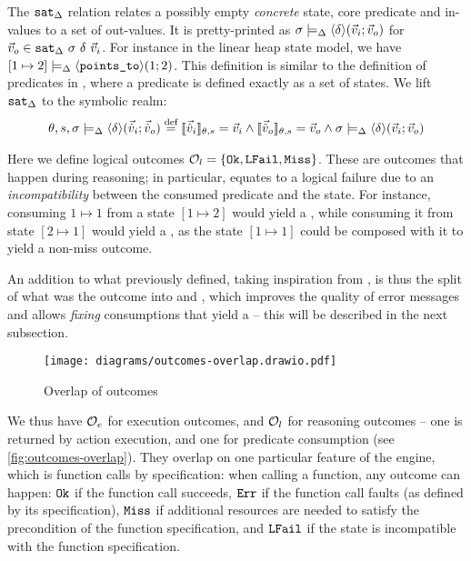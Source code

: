 The $\texttt{sat}_{\Delta}$ relation relates a possibly empty \emph{concrete} state, core predicate and in-values to a set of out-values. It is pretty-printed as $\sigma \models_{\Delta} \left<\delta\right>\!(\vec{v}_i;\vec{v}_o)$ for $\vec{v}_o \in \texttt{sat}_{\Delta}~\sigma~\delta~\vec{v}_i$. For instance in the linear heap state model, we have $[ 1 \mapsto 2 ] \models_{\Delta} \left<\texttt{points\_to}\right>\!(1;2)$. This definition is similar to the definition of predicates in \cite{abstractseplogic,localreasoning}, where a predicate is defined exactly as a set of states. We lift $\texttt{sat}_{\Delta}$ to the symbolic realm: 
\begin{align*}
	\theta,s,\sigma\models_{\Delta} \left<\delta\right>\!(\vec{\hat{v}}_i;\vec{\hat{v}}_o) \stackrel{\textnormal{def}}= \llbracket\vec{\hat{v}}_i\rrbracket_{\theta,s}=\vec{v}_i \land \llbracket\vec{\hat{v}}_o\rrbracket_{\theta,s}=\vec{v}_o \land \sigma\models_{\Delta} \left<\delta\right>\!(\vec{v}_i;\vec{v}_o)
\end{align*}

Here we define logical outcomes ${\cal O}_l = \{\texttt{Ok}, \texttt{LFail}, \texttt{Miss} \}$. These are outcomes that happen during reasoning; in particular, \LFail{} equates to a logical failure due to an \emph{incompatibility} between the consumed predicate and the state. For instance, consuming $1 \mapsto 1$ from a state $[1 \mapsto 2]$ would yield a \LFail{}, while consuming it from state $[2 \mapsto 1]$ would yield a \Miss{}, as the state $[1\mapsto 1]$ could be composed with it to yield a non-miss outcome. 

An addition to what \cite{cse2} previously defined, taking inspiration from \cite{sacha-phd}, is thus the split of what was the  outcome into \LFail{} and \Miss{}, which improves the quality of error messages and allows \emph{fixing} consumptions that yield a \Miss{} -- this will be described in the next subsection. 

\begin{figure}
	\centering
	\texttt{[image: diagrams/outcomes-overlap.drawio.pdf]}
	\caption{Overlap of outcomes}
	\label{fig:outcomes-overlap}
\end{figure}

We thus have ${\cal O}_e$ for execution outcomes, and ${\cal O}_l$ for reasoning outcomes -- one is returned by action execution, and one for predicate consumption (see \autoref{fig:outcomes-overlap}). They overlap on one particular feature of the engine, which is function calls by specification: when calling a function, any outcome can happen: $\texttt{Ok}$ if the function call succeeds, $\texttt{Err}$ if the function call faults (as defined by its specification), $\texttt{Miss}$ if additional resources are needed to satisfy the precondition of the function specification, and $\texttt{LFail}$ if the state is incompatible with the function specification.

